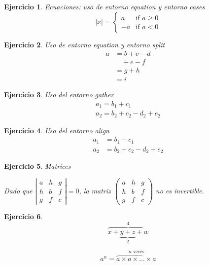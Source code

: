 \documentclass[12pt,a4paper]{article}
\newtheorem{ejer}{Ejercicio}
\begin{document}
\begin{ejer}
Ecuaciones: uso de entorno equation y entorno cases
\begin{equation*}
|x| =
\begin{cases}
a & \text{if $a\ge 0$}\\
-a & \text{if $a< 0$}
\end{cases}
\end{equation*}
\end{ejer}
\begin{ejer}
Uso de entorno equation y entorno split
\begin{equation}
\begin{split}
a& =b+c-d\\
& \quad +e-f\\
& =g+h\\
& =i
\end{split}
\end{equation}
\end{ejer}
\begin{ejer}
Uso del entorno gather
\begin{gather}
a_1=b_1+c_1\\
a_2=b_2+c_2-d_2+e_2
\end{gather}
\end{ejer}
\begin{ejer}
Uso del entorno align
\begin{align}
a_1& =b_1+c_1\\
a_2& =b_2+c_2-d_2+e_2
\end{align}
\end{ejer}


\begin{ejer}
Matrices

Dado que
$
\left|\begin{smallmatrix}
a & h & g\\
h & b & f\\
g & f & c
\end{smallmatrix}\right|
=0
$,
la matriz
$
\left(\begin{smallmatrix}
a & h & g\\
h & b & f\\
g & f & c
\end{smallmatrix}\right)
$
no es invertible.
\end{ejer}


\begin{ejer}
\[
\overbrace{x+\underbrace{y+z}_{2} +w}^{4} 
\]

\begin{displaymath}
a^{n}=\overbrace{a \times a \times \ldots \times a}^{\mbox{$n$ veces}}
\end{displaymath}
\end{ejer}
\end{document}
